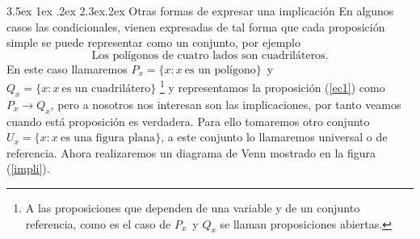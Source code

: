 \documentclass[11pt,spanish,letter]{book}
\makeatletter
\renewcommand\subsection{\@startsection {subsection}{1}{-5pt}%
                                   {3.5ex \@plus 1ex \@minus .2ex
                                   }%
                                   {2.3ex\@plus .2ex
                                   \vskip 0.2\p@ \vskip 1pt}%
                                   {\centering\sc\large\color{blue}}}
\newcounter{ejemplo}[section]%
\makeatother
\begin{document}
\subsection{Otras formas de expresar una implicación}
En algunos casos las condicionales, vienen expresadas de tal forma que cada
proposición simple se puede representar como un conjunto, por ejemplo
\begin{equation}
 \mbox{Los polígonos de cuatro lados son cuadriláteros.}
\label{ec1}
\end{equation} 
En este caso llamaremos $P_x=\{x:x\ \mbox{es un polígono}\}$\ y
$Q_x=\{x:x\ \mbox{es un cuadrilátero}\}$ \footnote{A las proposiciones que
dependen de una variable y de un conjunto referencia, como es el caso de $P_x$\
y $Q_x$ se llaman proposiciones abiertas. } y representamos la proposición
(\ref{ec1}) como
$P_x \rightarrow Q_x$, pero a nosotros nos interesan son las implicaciones, por
tanto veamos cuando está proposición es verdadera. Para ello tomaremos otro
conjunto $U_x=\{x:x\ \mbox{es una figura plana}\}$, a este conjunto lo
llamaremos universal o de referencia.
Ahora realizaremos un diagrama de Venn mostrado en la figura (\ref{impli}).
\end{document}
